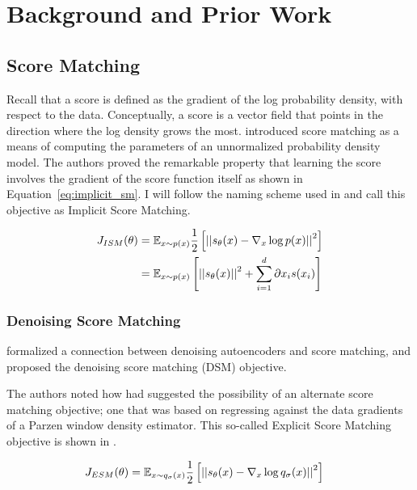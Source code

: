 \chapter{Background and Prior Work}
\label{ch:background}

\section{Score Matching}
Recall that a score is defined as the gradient of the log probability density, with respect to the data. Conceptually, a score is a vector field that points in the direction where the log density grows the most. 
\cite{hyvarinen2005} introduced score matching as a means of computing the parameters of an unnormalized probability density model. The authors proved the remarkable property that learning the score involves the gradient of the score function itself as shown in Equation~\ref{eq:implicit_sm}. I will follow the naming scheme used in \cite{vincent2011connection} and call this objective as Implicit Score Matching.

\begin{align}
\label{eq:implicit_sm}
    J_{ISM}(\theta) &= \mathbb{E}_{x \sim p(x)} \frac{1}{2} \left[ { \left|\left| {s_\theta(x) - \nabla_x \log p(x) } \right|\right|^2 } \right] \\
    &= \mathbb{E}_{x \sim p(x)} \left[ { \left|\left| {s_\theta(x)} \right|\right|^2 + \sum^{d}_{i=1}{\partial{x_{i}} s(x_{i}) } } \right]
\end{align}


\subsection*{Denoising Score Matching}

\cite{vincent2011connection} formalized a connection between denoising autoencoders and score matching, and proposed the denoising score matching (DSM) objective.

The authors noted how \cite{hyvarinen2005} had suggested the possibility of an alternate score matching objective; one that was based on regressing against the data gradients of a Parzen window density estimator. This so-called Explicit Score Matching objective is shown in .

\begin{align}
\label{eq:explicit_sm}
    J_{ESM}(\theta) &= \mathbb{E}_{x \sim q_{\sigma}(x)} \frac{1}{2} \left[ { \left|\left| {s_\theta(x) - \nabla_x \log q_{\sigma}(x) } \right|\right|^2 } \right]
\end{align}

